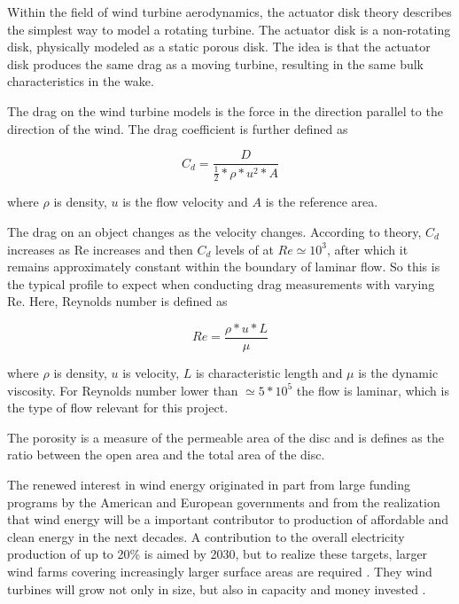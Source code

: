 Within the field of wind turbine aerodynamics, the actuator disk theory describes the simplest way to model a rotating turbine. The actuator disk is a non-rotating disk, physically modeled as a static porous disk. The idea is that the actuator disk produces the same drag as a moving turbine, resulting in the same bulk characteristics in the wake. 

The drag on the wind turbine models is the force in the direction parallel to the direction of the wind. The drag coefficient is further defined as 

\begin{equation}
    C_d = \frac{D}{\frac{1}{2}*\rho*u^2*A}
    \label{Eq:Cd}
\end{equation}

where $\rho$ is density, $u$ is the flow velocity and $A$ is the reference area.  

The drag on an object changes as the velocity changes. According to theory, $C_d$ increases as Re increases and then $C_d$ levels of at $ Re \simeq 10^3$, after which it remains approximately constant within the boundary of laminar flow. So this is the typical profile to expect when conducting drag measurements with varying Re. Here, Reynolds number is defined as 

\begin{equation}
    Re = \frac{\rho * u * L}{\mu}
\end{equation}

where $\rho$ is density, $u$ is velocity, $L$ is characteristic length and $\mu$ is the dynamic viscosity. For Reynolds number lower than $\simeq 5 * 10^5$ the flow is laminar, which is the type of flow relevant for this project. 






The porosity is a measure of the permeable area of the disc and is defines as the ratio between the open area and the total area of the disc. 


The renewed interest in wind energy originated in part from large funding programs by the American and European governments and from the realization that wind energy will be a important contributor to production of affordable and clean energy in the next decades. A contribution to the overall electricity production of up to 20\% is aimed by 2030, but to realize these targets, larger wind farms covering increasingly larger surface areas are required \cite{Meyers2012}. They wind turbines will grow not only in size, but also in capacity and money invested \cite{Barthelmie2010}. 

